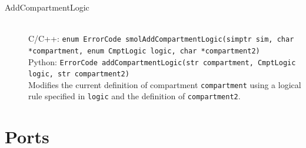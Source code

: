 \documentclass {scrbook}
\newcommand {\ttt} {\texttt}
\begin{document}
\begin{description}
\item[AddCompartmentLogic]
\hfill \\
C/C++: \ttt{enum ErrorCode smolAddCompartmentLogic(simptr sim, char *compartment, enum CmptLogic logic, char *compartment2)}\\
Python: \ttt{ErrorCode addCompartmentLogic(str compartment, CmptLogic logic, str compartment2)}\\
Modifies the current definition of compartment \ttt{compartment} using a logical rule specified in \ttt{logic} and the definition of \ttt{compartment2}.

\end{description}


\section{Ports}
\end{document}
